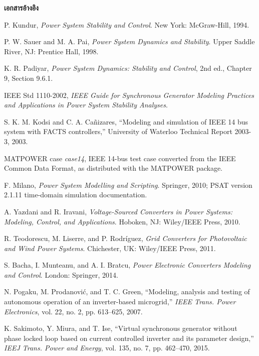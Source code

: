 \documentclass[12pt,a4paper]{article}
\newcommand{\templateheading}[1]{%
  \vspace{0.45em}\noindent\colorbox{academicblue}{\parbox{\dimexpr\textwidth-2\fboxsep\relax}{\color{white}\fontsize{20}{22}\selectfont\bfseries #1}}\par\vspace{0.28em}}
\begin{document}
\clearpage
\templateheading{เอกสารอ้างอิง}
\begin{enumerate}[label={[\arabic*]},leftmargin=2.6em]
\item\label{ref:kundur} P. Kundur, \emph{Power System Stability and Control}. New York: McGraw-Hill, 1994.
\item\label{ref:sauerpai} P. W. Sauer and M. A. Pai, \emph{Power System Dynamics and Stability}. Upper Saddle River, NJ: Prentice Hall, 1998.
\item\label{ref:padiyar} K. R. Padiyar, \emph{Power System Dynamics: Stability and Control}, 2nd ed., Chapter 9, Section 9.6.1.
\item\label{ref:ieee1110} IEEE Std 1110-2002, \emph{IEEE Guide for Synchronous Generator Modeling Practices and Applications in Power System Stability Analyses}.
\item\label{ref:kodsi} S. K. M. Kodsi and C. A. Ca\~{n}izares, ``Modeling and simulation of IEEE 14 bus system with FACTS controllers,'' University of Waterloo Technical Report 2003-3, 2003.
\item\label{ref:matpower} MATPOWER case \emph{case14}, IEEE 14-bus test case converted from the IEEE Common Data Format, as distributed with the MATPOWER package.
\item\label{ref:psat} F. Milano, \emph{Power System Modelling and Scripting}. Springer, 2010; PSAT version 2.1.11 time-domain simulation documentation.
\item\label{ref:yazdani} A. Yazdani and R. Iravani, \emph{Voltage-Sourced Converters in Power Systems: Modeling, Control, and Applications}. Hoboken, NJ: Wiley/IEEE Press, 2010.
\item\label{ref:teodorescu} R. Teodorescu, M. Liserre, and P. Rodr\'{i}guez, \emph{Grid Converters for Photovoltaic and Wind Power Systems}. Chichester, UK: Wiley/IEEE Press, 2011.
\item\label{ref:bacha} S. Bacha, I. Munteanu, and A. I. Bratcu, \emph{Power Electronic Converters Modeling and Control}. London: Springer, 2014.
\item\label{ref:pogaku} N. Pogaku, M. Prodanovi\'{c}, and T. C. Green, ``Modeling, analysis and testing of autonomous operation of an inverter-based microgrid,'' \emph{IEEE Trans. Power Electronics}, vol. 22, no. 2, pp. 613--625, 2007.
\item\label{ref:sakimoto} K. Sakimoto, Y. Miura, and T. Ise, ``Virtual synchronous generator without phase locked loop based on current controlled inverter and its parameter design,'' \emph{IEEJ Trans. Power and Energy}, vol. 135, no. 7, pp. 462--470, 2015.

\end{enumerate}
\end{document}
